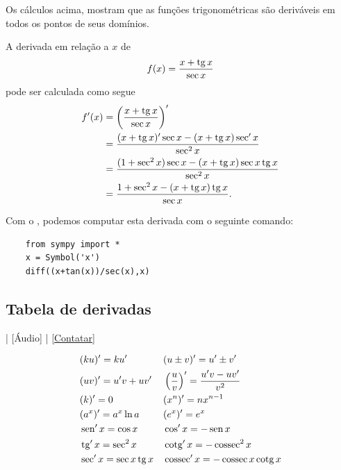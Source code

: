\begin{obs}
  Os cálculos acima, mostram que as funções trigonométricas são deriváveis em todos os pontos de seus domínios.
\end{obs}

\begin{ex}
  A derivada em relação a $x$ de
  \begin{equation}
    f(x) = \frac{x + \operatorname{tg} x}{\sec x}
  \end{equation}
  pode ser calculada como segue
  \begin{align}
    f'(x) &= \left(\frac{x+\operatorname{tg} x}{\sec x}\right)' \\
          &= \frac{(x+\operatorname{tg} x)'\sec x - (x+\operatorname{tg} x)\sec' x}{\sec^2 x} \\
          &= \frac{(1+\sec^2 x)\sec x - (x+\operatorname{tg} x)\sec x\operatorname{tg} x}{\sec^2 x} \\
          &= \frac{1+\sec^2 x - (x+\operatorname{tg} x)\operatorname{tg} x}{\sec x}.
  \end{align}

  \ifispython
  Com o \sympy, podemos computar esta derivada com o seguinte comando:
\begin{lstlisting}
    from sympy import *
    x = Symbol('x')
    diff((x+tan(x))/sec(x),x)
  \end{lstlisting}
  \fi
\end{ex}

\subsection{Tabela de derivadas}

\begin{flushright}
  [Vídeo] | [Áudio] | \href{https://phkonzen.github.io/notas/contato.html}{[Contatar]}
\end{flushright}

\begin{align}
  & (ku)' = ku' && (u\pm v)' = u' \pm v'\\
  & (uv)' = u'v + uv' && \left(\frac{u}{v}\right)' = \frac{u'v - uv'}{v^2} \\
  & (k)' = 0 && (x^n)' = nx^{n-1}\\
  & (a^x)' = a^x\ln a && (e^x)' = e^x \\
  & \operatorname{sen}' x = \cos x && \cos' x = - \operatorname{sen} x\\
  & \operatorname{tg}' x = \sec^2 x && \operatorname{cotg}' x = -\operatorname{cossec}^2 x \\
  & \sec' x = \sec x \operatorname{tg} x && \operatorname{cossec}' x = -\operatorname{cossec} x\operatorname{cotg} x
\end{align}

